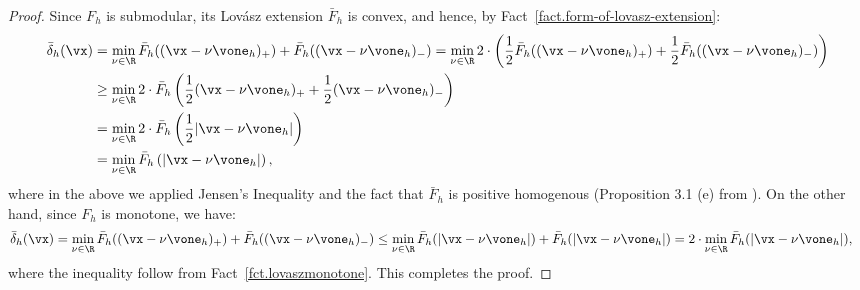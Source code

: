 \documentclass[letterpaper]{article}
\begin{document}
\formoflovaszextensionsym
\begin{proof}
    Since $F_h$ is submodular, its Lov\'asz extension $\bar{F}_h$ is convex, and hence, by Fact~\ref{fact.form-of-lovasz-extension}:
    \begin{align*}
        \bar{\delta}_h(\vx) &= \min_{\nu \in \R}\bar{F}_h((\vx - \nu \vone_h)_+ ) + \bar{F}_h((\vx - \nu \vone_h)_-) =  \min_{\nu \in \R} 2 \cdot \left({1\over 2}\bar{F}_h((\vx - \nu \vone_h)_+ ) + {1\over 2}\bar{F}_h((\vx - \nu \vone_h)_-)\right)\\
        &\geq  \min_{\nu \in \R} 2 \cdot \bar{F}_h\left({1\over 2}(\vx - \nu \vone_h)_+  + {1\over 2}(\vx - \nu \vone_h)_-\right)\\
        &=  \min_{\nu \in \R} 2 \cdot \bar{F}_h\left({1\over 2}|\vx - \nu \vone_h|\right)\\
        &=  \min_{\nu \in \R}\bar{F}_h\left(|\vx - \nu \vone_h|\right),
    \end{align*}
    where in the above we applied Jensen's Inequality and the fact that $\bar{F}_h$ is positive homogenous (Proposition 3.1 (e) from \cite{bach2013learning}). On the other hand, since $F_h$ is monotone, we have:
    \begin{align*}
        \bar{\delta}_h(\vx) &= \min_{\nu \in \R}\bar{F}_h((\vx - \nu \vone_h)_+ ) + \bar{F}_h((\vx - \nu \vone_h)_-) \leq \min_{\nu \in \R}\bar{F}_h(|\vx - \nu \vone_h|) + \bar{F}_h(|\vx - \nu \vone_h|) = 2\cdot \min_{\nu \in \R}\bar{F}_h(|\vx - \nu \vone_h|),
    \end{align*}
    where the inequality follow from Fact~\ref{fct.lovaszmonotone}. This completes the proof.
\end{proof}
\end{document}
